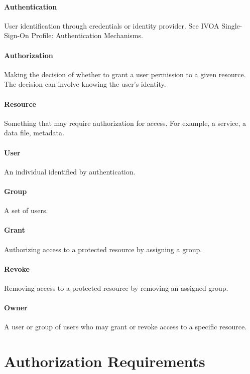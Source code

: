\documentclass[11pt,a4paper]{ivoa}
\begin{document}
\paragraph{Authentication} User identification through credentials or identity provider.  See IVOA Single-Sign-On Profile: Authentication Mechanisms.  \citep{2017ivoa.spec.0524T}

\paragraph{Authorization} Making the decision of whether to grant a user permission to a given resource.  The decision can involve knowing the user's identity.

\paragraph{Resource} Something that may require authorization for access.  For example, a service, a data file, metadata.

\paragraph{User} An individual identified by authentication.

\paragraph{Group} A set of users.

\paragraph{Grant} Authorizing access to a protected resource by assigning a group.

\paragraph{Revoke} Removing access to a protected resource by removing an assigned group.

\paragraph{Owner} A user or group of users who may grant or revoke access to a specific resource.

\section{Authorization Requirements}
\end{document}
